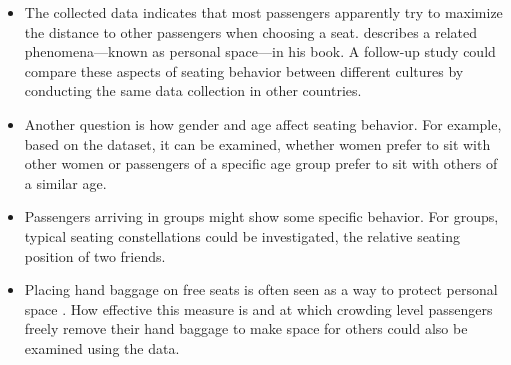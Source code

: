 \begin{itemize}[noitemsep]

  \item The collected data indicates that most passengers apparently try to
    maximize the distance to other passengers when choosing a seat.
    \citet{hall-1966} describes a related phenomena---known as personal space---in
    his book.
    A follow-up study could compare these aspects of seating behavior between
    different cultures by conducting the same data collection in other countries.

  \item Another question is how gender and age affect seating behavior.
    For example, based on the dataset, it can be examined, whether women prefer
    to sit with other women or passengers of a specific age group prefer to sit
    with others of a similar age.

  \item Passengers arriving in groups might show some specific behavior.
    For groups, typical seating constellations could be investigated, \eg the
    relative seating position of two friends.

  \item Placing hand baggage on free seats is often seen as a way to protect
    personal space \citep{rueger-2010,cis-2009,plank-2008}.
    How effective this measure is and at which crowding level passengers freely
    remove their hand baggage to make space for others could also be examined
    using the data.


\end{itemize}

